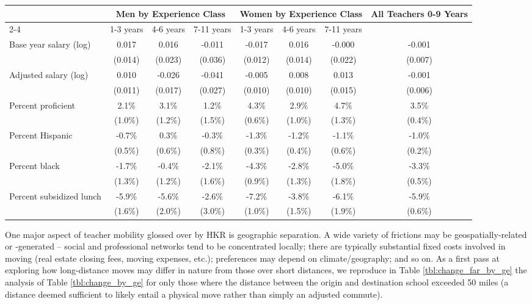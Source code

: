 \documentclass[12pt,]{article}
\begin{document}
\begin{sidewaystable}[htbp]
\centering
\begin{tabular}{lccccccc}
  \hline
 & \multicolumn{3}{c}{Men by Experience Class} & \multicolumn{3}{c}{Women by Experience Class} & \multirow{2}{*}{\parbox{0.09\linewidth}{All Teachers 0-9 Years}}\\ \cline{2-4} \cline{5-7}
 & 1-3 years & 4-6 years & 7-11 years & 1-3 years & 4-6 years & 7-11 years &  \\ 
  \hline
Base year salary (log) & 0.017 & 0.016 & -0.011 & -0.017 & 0.016 & -0.000 & -0.001 \\ 
   & (0.014) & (0.023) & (0.036) & (0.012) & (0.014) & (0.022) & (0.007) \\ 
  Adjusted salary (log) & 0.010 & -0.026 & -0.041 & -0.005 & 0.008 & 0.013 & -0.001 \\ 
   & (0.011) & (0.017) & (0.027) & (0.010) & (0.010) & (0.015) & (0.006) \\ 
  Percent proficient & 2.1\% & 3.1\% & 1.2\% & 4.3\% & 2.9\% & 4.7\% & 3.5\% \\ 
   & (1.0\%) & (1.2\%) & (1.5\%) & (0.6\%) & (1.0\%) & (1.3\%) & (0.4\%) \\ 
  Percent Hispanic & -0.7\% & 0.3\% & -0.3\% & -1.3\% & -1.2\% & -1.1\% & -1.0\% \\ 
   & (0.5\%) & (0.6\%) & (0.8\%) & (0.3\%) & (0.4\%) & (0.6\%) & (0.2\%) \\ 
  Percent black & -1.7\% & -0.4\% & -2.1\% & -4.3\% & -2.8\% & -5.0\% & -3.3\% \\ 
   & (1.3\%) & (1.2\%) & (1.6\%) & (0.9\%) & (1.3\%) & (1.8\%) & (0.5\%) \\ 
  Percent subsidized lunch & -5.9\% & -5.6\% & -2.6\% & -7.2\% & -3.8\% & -6.1\% & -5.9\% \\ 
   & (1.6\%) & (2.0\%) & (3.0\%) & (1.0\%) & (1.5\%) & (1.9\%) & (0.6\%) \\ 
   \hline
\end{tabular}
\caption{Average Change in Salary and District Student Characteristics (and Standard Deviations) for Teachers Changing to a district more than 50 Miles Away, by Gender and Experience} 
\label{tbl:change_far_by_ge}
\end{sidewaystable}

One major aspect of teacher mobility glossed over by HKR is geographic
separation. A wide variety of frictions may be geospatially-related or
-generated -- social and professional networks tend to be concentrated
locally; there are typically substantial fixed costs involved in moving
(real estate closing fees, moving expenses, etc.); preferences may
depend on climate/geography; and so on. As a first pass at exploring how
long-distance moves may differ in nature from those over short
distances, we reproduce in Table \ref{tbl:change_far_by_ge} the analysis
of Table \ref{tbl:change_by_ge} for only those where the distance
between the origin and destination school exceeded 50 miles (a distance
deemed sufficient to likely entail a physical move rather than simply an
adjusted commute).
\end{document}
